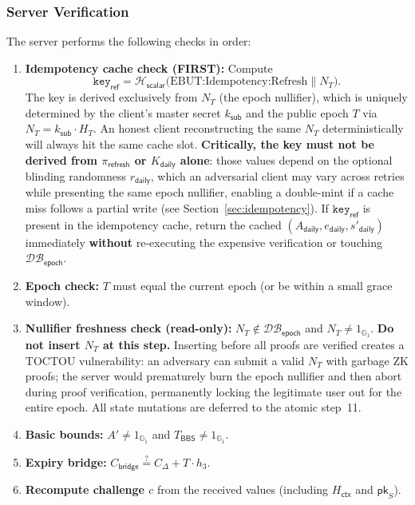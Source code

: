 \documentclass[11pt]{article}
\theoremstyle{definitionstyle}
\theoremstyle{plain}
\newcommand{\DB}{\mathcal{DB}}
\begin{document}
\subsubsection{Server Verification}
The server performs the following checks in order:
\begin{enumerate}[leftmargin=*]
\item \textbf{Idempotency cache check (FIRST):} Compute
  \[
  \mathtt{key}_{\mathsf{ref}} = \mathcal{H}_{\mathsf{scalar}}\!\bigl(\text{EBUT:Idempotency:Refresh} \parallel N_T\bigr).
  \]
  The key is derived exclusively from $N_T$ (the epoch nullifier), which is uniquely determined by the client's master secret $k_{\mathsf{sub}}$ and the public epoch $T$ via $N_T = k_{\mathsf{sub}} \cdot H_T$.  An honest client reconstructing the same $N_T$ deterministically will always hit the same cache slot.  \textbf{Critically, the key must not be derived from $\pi_{\mathsf{refresh}}$ or $K_{\mathsf{daily}}$ alone}: those values depend on the optional blinding randomness $r_{\mathsf{daily}}$, which an adversarial client may vary across retries while presenting the same epoch nullifier, enabling a double-mint if a cache miss follows a partial write (see Section~\ref{sec:idempotency}).  If $\mathtt{key}_{\mathsf{ref}}$ is present in the idempotency cache, return the cached $(A_{\mathsf{daily}}, e_{\mathsf{daily}}, s'_{\mathsf{daily}})$ immediately \textbf{without} re-executing the expensive verification or touching $\DB_{\mathsf{epoch}}$.
\item \textbf{Epoch check:} $T$ must equal the current epoch (or be within a small grace window).
\item \textbf{Nullifier freshness check (read-only):} $N_T \notin \DB_{\mathsf{epoch}}$ and $N_T \neq 1_{\mathbb{G}_1}$. \textbf{Do not insert $N_T$ at this step.} Inserting before all proofs are verified creates a TOCTOU vulnerability: an adversary can submit a valid $N_T$ with garbage ZK proofs; the server would prematurely burn the epoch nullifier and then abort during proof verification, permanently locking the legitimate user out for the entire epoch. All state mutations are deferred to the atomic step~11.
\item \textbf{Basic bounds:} $A' \neq 1_{\mathbb{G}_1}$ and $T_{\mathsf{BBS}} \neq 1_{\mathbb{G}_1}$.
\item \textbf{Expiry bridge:} $C_{\mathsf{bridge}} \stackrel{?}{=} C_{\Delta} + T \cdot h_3$.
\item \textbf{Recompute challenge $c$} from the received values (including $H_{\mathsf{ctx}}$ and $\mathsf{pk}_S$).

\end{enumerate}
\end{document}
